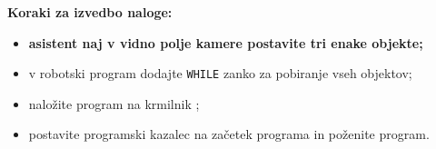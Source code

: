 



\vspace{5mm}

\begin{mdframed}[backgroundcolor=yellow!20, shadow=true,roundcorner=8pt]
\textbf{Koraki za izvedbo naloge:}
\end{mdframed}
\begin{mdframed}[backgroundcolor=red!20, shadow=true,roundcorner=8pt]
    \begin{itemize}
       \item \textbf{asistent naj v vidno polje kamere postavite tri enake objekte;}
    \end{itemize}
\end{mdframed} 
\begin{mdframed}[backgroundcolor=yellow!20, shadow=true,roundcorner=8pt]
\begin{itemize}
  \item v robotski program dodajte \verb"WHILE" zanko za pobiranje vseh objektov;
  \item naložite program na krmilnik ;
  \item postavite programski kazalec na začetek programa in poženite program.
\end{itemize}
\end{mdframed}






